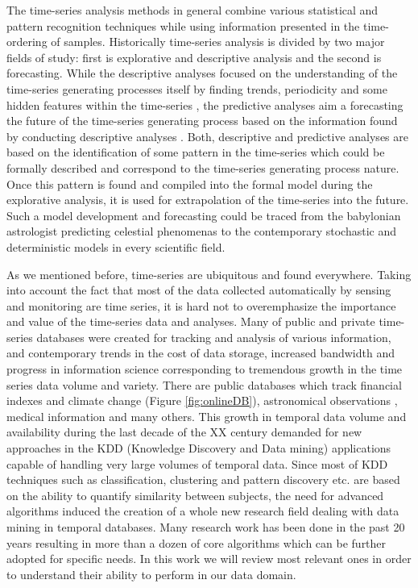 The time-series analysis methods in general combine various statistical and pattern recognition techniques while using information presented in the time-ordering of samples. Historically time-series analysis is divided by two major fields of study: first is explorative and descriptive analysis and the second is forecasting. 
While the descriptive analyses focused on the understanding of the time-series generating processes itself by finding trends, periodicity and some hidden features within the time-series \cite{citeulike:2206845}, the predictive analyses aim a forecasting the future of the time-series generating process based on the information found by conducting descriptive analyses \cite{citeulike:3449765}. 
Both, descriptive and predictive analyses are based on the identification of some pattern in the time-series which could be formally described and correspond to the time-series generating process nature. Once this pattern is found and compiled into the formal model during the explorative analysis, it is used for extrapolation of the time-series into the future. Such a model development and forecasting could be traced from the babylonian astrologist predicting celestial phenomenas to the contemporary stochastic and deterministic models in every scientific field.

As we mentioned before, time-series are ubiquitous and found everywhere. Taking into account the fact that most of the data collected automatically by sensing and monitoring are time series, it is hard not to overemphasize the importance and value of the time-series data and analyses. Many of public and private time-series databases were created for tracking and analysis of various information, and contemporary trends in the cost of data storage, increased bandwidth and progress in information science corresponding to tremendous growth in the time series data volume and variety. There are public databases which track financial indexes and climate change (Figure \ref{fig:onlineDB}), astronomical observations \cite{citeulike:4373331}, medical information \cite{citeulike:4373332} and many others.  This growth in temporal data volume and availability during the last decade of the XX century demanded for new approaches in the KDD (Knowledge Discovery and Data mining) applications capable of handling very large volumes of temporal data. Since most of KDD techniques such as classification, clustering and pattern discovery etc. are based on the ability to quantify similarity between subjects, the need for advanced algorithms induced the creation of a whole new research field dealing with data mining in temporal databases. Many research work has been done in the past 20 years resulting in more than a dozen of core algorithms which can be further adopted for specific needs. In this work we will review most relevant ones in order to understand their ability to perform in our data domain.

